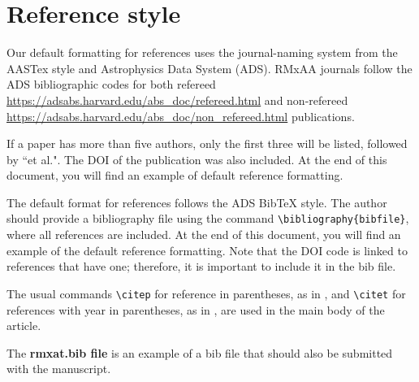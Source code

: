 \documentclass[10pt,letter,twoside]{rmat-rho}
\newcommand{\CS}[1]{\texttt{\textbackslash #1}}
\begin{document}


\section{Reference style}

     Our default formatting for references uses the journal-naming system from the AASTex style and Astrophysics Data System (ADS). RMxAA journals follow the ADS bibliographic codes for both refereed \url{https://adsabs.harvard.edu/abs_doc/refereed.html} and non-refereed \url{https://adsabs.harvard.edu/abs_doc/non_refereed.html} publications.
    
    If a paper has more than five authors, only the first three will be listed, followed by ``et al.". The DOI of the publication was also included. At the end of this document, you will find an example of default reference formatting. 

    The default format for references follows the ADS BibTeX style. The author should provide a bibliography file using the command \CS{bibliography}\verb|{bibfile}|, where all references are included. At the end of this document, you will find an example of the default reference formatting. Note that the DOI code is linked to references that have one; therefore, it is important to include it in the bib file.
    
    The usual commands \CS{citep} for reference in parentheses, as in \citep{Roman23},  and \CS{citet} for references with year in parentheses, as in \citet{Roman23}, are used in the main body of the article.   
    
The {\bf rmxat.bib file} is an example of a bib file that should also be submitted with the manuscript.




\end{document}
